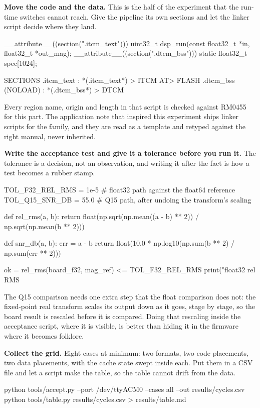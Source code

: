 \begin{steps}
\item \textbf{Move the code and the data.} This is the half of the experiment
that the run-time switches cannot reach. Give the pipeline its own sections and
let the linker script decide where they land.
\begin{ccode}
__attribute__((section(".itcm_text"))) uint32_t dsp_run(const float32_t *in,
                                                        float32_t *out_mag);
__attribute__((section(".dtcm_bss"))) static float32_t spec[1024];
\end{ccode}
\begin{ldcode}
SECTIONS
{
  .itcm_text : { *(.itcm_text*) } > ITCM AT> FLASH
  .dtcm_bss (NOLOAD) : { *(.dtcm_bss*) } > DTCM
}
\end{ldcode}
Every region name, origin and length in that script is checked against RM0455
for this part. The application note that inspired this experiment ships linker
scripts for the family, and they are read as a template and retyped against the
right manual, never inherited.

\item \textbf{Write the acceptance test and give it a tolerance before you run
it.} The tolerance is a decision, not an observation, and writing it after the
fact is how a test becomes a rubber stamp.
\begin{pycode}
TOL_F32_REL_RMS = 1e-5      # float32 path against the float64 reference
TOL_Q15_SNR_DB  = 55.0      # Q15 path, after undoing the transform's scaling

def rel_rms(a, b):
    return float(np.sqrt(np.mean((a - b) ** 2)) / np.sqrt(np.mean(b ** 2)))

def snr_db(a, b):
    err = a - b
    return float(10.0 * np.log10(np.sum(b ** 2) / np.sum(err ** 2)))

ok = rel_rms(board_f32, mag_ref) <= TOL_F32_REL_RMS
print("float32 rel RMS %
\end{pycode}
The Q15 comparison needs one extra step that the float comparison does not: the
fixed-point real transform scales its output down as it goes, stage by stage,
so the board result is rescaled before it is compared. Doing that rescaling
inside the acceptance script, where it is visible, is better than hiding it in
the firmware where it becomes folklore.

\item \textbf{Collect the grid.} Eight cases at minimum: two formats, two code
placements, two data placements, with the cache state swept inside each. Put
them in a CSV file and let a script make the table, so the table cannot drift
from the data.
\begin{shellcode}
python tools/accept.py --port /dev/ttyACM0 --cases all --out results/cycles.csv
python tools/table.py results/cycles.csv > results/table.md
\end{shellcode}
\end{steps}


